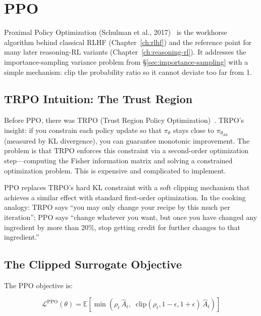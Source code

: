 \section{PPO}
\label{sec:ppo}

Proximal Policy Optimization (Schulman et al., 2017)~\cite{schulman2017ppo} is the workhorse algorithm behind classical RLHF (Chapter~\ref{ch:rlhf}) and the reference point for many later reasoning-RL variants (Chapter~\ref{ch:reasoning-rl}). It addresses the importance-sampling variance problem from \S\ref{sec:importance-sampling} with a simple mechanism: clip the probability ratio so it cannot deviate too far from 1.

\subsection{TRPO Intuition: The Trust Region}

Before PPO, there was TRPO (Trust Region Policy Optimization)~\cite{schulman2015trpo}. TRPO's insight: if you constrain each policy update so that $\pi_\theta$ stays close to $\pi_{\theta_{\text{old}}}$ (measured by KL divergence), you can guarantee monotonic improvement. The problem is that TRPO enforces this constraint via a second-order optimization step---computing the Fisher information matrix and solving a constrained optimization problem. This is expensive and complicated to implement.

PPO replaces TRPO's hard KL constraint with a soft clipping mechanism that achieves a similar effect with standard first-order optimization. In the cooking analogy: TRPO says ``you may only change your recipe by this much per iteration''; PPO says ``change whatever you want, but once you have changed any ingredient by more than 20\%, stop getting credit for further changes to that ingredient.''

\subsection{The Clipped Surrogate Objective}

The PPO objective is:

\begin{equation}
\label{eq:ppo-clip}
\mathcal{L}^{\text{PPO}}(\theta) = \mathbb{E}\!\left[\min\!\left(\rho_t \, \hat{A}_t, \;\; \text{clip}(\rho_t, 1-\epsilon, 1+\epsilon) \, \hat{A}_t\right)\right]
\end{equation}

